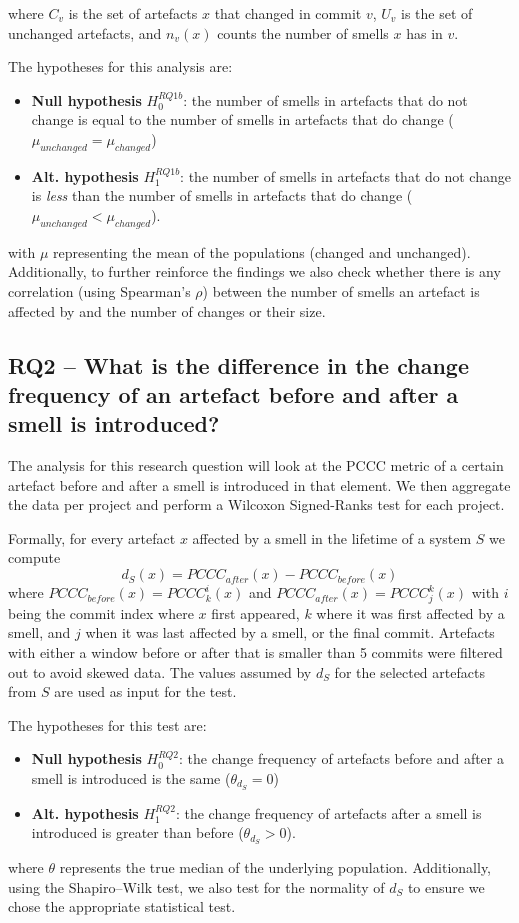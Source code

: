 where $C_v$ is the set of artefacts $x$ that changed in commit $v$, $U_v$ is the set of unchanged artefacts, and $n_v(x)$ counts the number of smells $x$ has in $v$.
 
The hypotheses for this analysis are:
\begin{itemize}
    \item \textbf{Null hypothesis} $H^{RQ1b}_0$: the number of smells in artefacts that do not change is equal to the number of smells in artefacts that do change ($\mu_{unchanged} = \mu_{changed} $)
    \item \textbf{Alt. hypothesis} $H^{RQ1b}_1$: the number of smells in artefacts that do not change is \emph{less} than the number of smells in artefacts that do change  ($\mu_{unchanged} < \mu_{changed} $).
\end{itemize}
with $\mu$ representing the mean of the populations (changed and unchanged).
Additionally, to further reinforce the findings we also check whether there is any correlation (using Spearman's $\rho$) between the number of smells an artefact is affected by and the number of changes or their size.

\subsection{RQ2 -- What is the difference in the change frequency of an artefact before and after a smell is introduced?}\label{c5:sec:rq2-analysis}
The analysis for this research question will look at the PCCC metric of a certain artefact before and after a smell is introduced in that element. We then aggregate the data per project and perform a Wilcoxon Signed-Ranks test \cite{Sheskin2007} for each project.

Formally, for every artefact $x$ affected by a smell in the lifetime of a system $S$ we compute 
$$d_S(x) = PCCC_{after}(x) - PCCC_{before}(x)$$
where $PCCC_{before}(x) = PCCC^i_k(x)$ and $PCCC_{after}(x) = PCCC^k_j(x)$ with $i$ being the commit index where $x$ first appeared, $k$ where it was first affected by a smell, and $j$ when it was last affected by a smell, or the final commit.
Artefacts with either a window before or after that is smaller than 5 commits were filtered out to avoid skewed data.
The values assumed by $d_S$ for the selected artefacts from $S$ are used as input for the test.

The hypotheses for this test are:
\begin{itemize}
    \item \textbf{Null hypothesis} $H^{RQ2}_0$: the change frequency of artefacts before and after a smell is introduced is the same ($\theta_{d_S} = 0$)
    \item \textbf{Alt. hypothesis} $H^{RQ2}_1$: the change frequency of artefacts after a smell is introduced is greater than before ($\theta_{d_S} > 0$). 
\end{itemize}
where $\theta$ represents the true median of the underlying population.
Additionally, using the Shapiro–Wilk test, we also test for the normality of $d_S$ to ensure we chose the appropriate statistical test.

